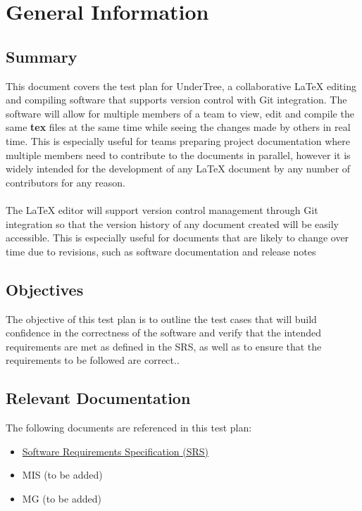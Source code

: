 \documentclass[12pt, titlepage]{article}
\begin{document}
	\section{General Information}
	
	\subsection{Summary}
	
	This document covers the test plan for UnderTree, a collaborative LaTeX editing and compiling software that supports version control with Git integration. The software will allow for multiple members of a team to view, edit and compile the same \textbf{tex} files at the same time while seeing the changes made by others in real time. This is especially useful for teams preparing project documentation where multiple members need to contribute to the documents in parallel, however it is widely intended for the development of any LaTeX document by any number of contributors for any reason.\\
	\\The LaTeX editor will support version control management through Git integration so that the version history of any document created will be easily accessible. This is especially useful for documents that are likely to change over time due to revisions, such as software documentation and release notes
	
	\subsection{Objectives}
	
	The objective of this test plan is to outline the test cases that will build confidence in the correctness of the software and verify that the intended requirements are met as defined in the SRS, as well as to ensure that the requirements to be followed are correct..
	
	\subsection{Relevant Documentation}
	
	The following documents are referenced in this test plan:\
	\begin{itemize}
		\item \href{https://github.com/RutheniumVI/UnderTree/blob/main/docs/SRS/SRS.pdf}{Software Requirements Specification (SRS)}
		\item MIS (to be added)
		\item MG (to be added)
	\end{itemize}
	
\end{document}
